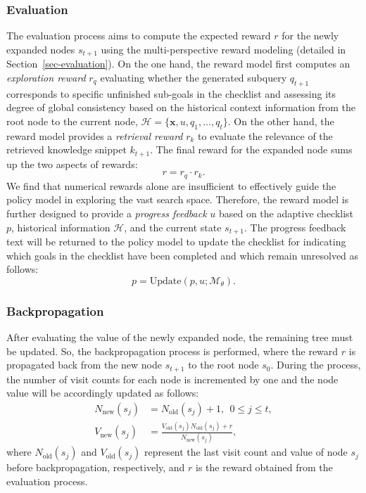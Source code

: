 \subsubsection{Evaluation}
The evaluation process aims to compute the expected reward $r$ for the newly expanded nodes $s_{t+1}$ using the multi-perspective reward modeling (detailed in Section~\ref{sec-evaluation}). On the one hand, the reward model first computes an \emph{exploration reward} $r_q$ evaluating whether the generated subquery $q_{t+1}$ corresponds to specific unfinished sub-goals in the checklist and assessing its degree of global consistency based on the historical context information from the root node to the current node, \ie $\mathcal{H} = \{ \bm{x}, u, q_1, ..., q_t \}$. On the other hand, the reward model provides a \emph{retrieval reward} $r_k$ to evaluate the relevance of the retrieved knowledge snippet $k_{t+1}$. The final reward for the expanded node sums up the two aspects of rewards: 
\begin{equation}
    r = r_q \cdot r_k. 
    \label{eq:reward}
\end{equation}
We find that numerical rewards alone are insufficient to effectively guide the policy model in exploring the vast search space. Therefore, the reward model is further designed to provide a \textit{progress feedback} $u$ based on the adaptive checklist $p$, historical information $\mathcal{H}$, and the current state $s_{t+1}$. The progress feedback text will be returned to the policy model to update the checklist for indicating which goals in the checklist have been completed and which remain unresolved as follows:
\begin{equation}\label{eq-update-checklist}
    p =\text{Update}(p, u; \mathcal{M}_\theta).
\end{equation}

\subsubsection{Backpropagation} 
After evaluating the value of the newly expanded node, the remaining tree must be updated. So, the backpropagation process is performed, where the reward $r$ is propagated back from the new node $s_{t+1}$ to the root node $s_0$. During the process, the number of visit counts for each node is incremented by one and the node value will be accordingly updated as follows:
\begin{align}
    N_{\text{new}}(s_j) &= N_{\text{old}}(s_j) + 1,~~0 \leq j \leq t, \\
    V_{\text{new}}(s_j) &= \frac{V_{\text{old}}(s_j)N_{\text{old}}(s_j) + r}{N_{\text{new}}(s_j)},
\end{align}
where $N_{\text{old}}(s_j)$ and $V_{\text{old}}(s_j)$ represent the last visit count and value of node $s_j$ before backpropagation, respectively, and $r$ is the reward obtained from the evaluation process.

